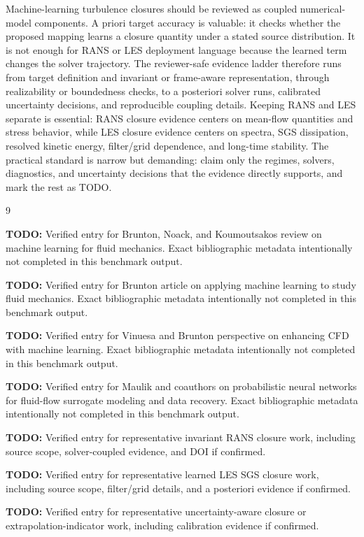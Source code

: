 \documentclass[11pt]{article}
\newcommand{\TODO}{\textbf{TODO: }}
\begin{document}
Machine-learning turbulence closures should be reviewed as coupled numerical-model components. A priori target accuracy is valuable: it checks whether the proposed mapping learns a closure quantity under a stated source distribution. It is not enough for RANS or LES deployment language because the learned term changes the solver trajectory. The reviewer-safe evidence ladder therefore runs from target definition and invariant or frame-aware representation, through realizability or boundedness checks, to a posteriori solver runs, calibrated uncertainty decisions, and reproducible coupling details. Keeping RANS and LES separate is essential: RANS closure evidence centers on mean-flow quantities and stress behavior, while LES closure evidence centers on spectra, SGS dissipation, resolved kinetic energy, filter/grid dependence, and long-time stability. The practical standard is narrow but demanding: claim only the regimes, solvers, diagnostics, and uncertainty decisions that the evidence directly supports, and mark the rest as TODO.

\begin{thebibliography}{9}

\TODO Verified entry for Brunton, Noack, and Koumoutsakos review on machine learning for fluid mechanics. Exact bibliographic metadata intentionally not completed in this benchmark output.

\TODO Verified entry for Brunton article on applying machine learning to study fluid mechanics. Exact bibliographic metadata intentionally not completed in this benchmark output.

\TODO Verified entry for Vinuesa and Brunton perspective on enhancing CFD with machine learning. Exact bibliographic metadata intentionally not completed in this benchmark output.

\TODO Verified entry for Maulik and coauthors on probabilistic neural networks for fluid-flow surrogate modeling and data recovery. Exact bibliographic metadata intentionally not completed in this benchmark output.

\TODO Verified entry for representative invariant RANS closure work, including source scope, solver-coupled evidence, and DOI if confirmed.

\TODO Verified entry for representative learned LES SGS closure work, including source scope, filter/grid details, and a posteriori evidence if confirmed.

\TODO Verified entry for representative uncertainty-aware closure or extrapolation-indicator work, including calibration evidence if confirmed.

\end{thebibliography}
\end{document}

